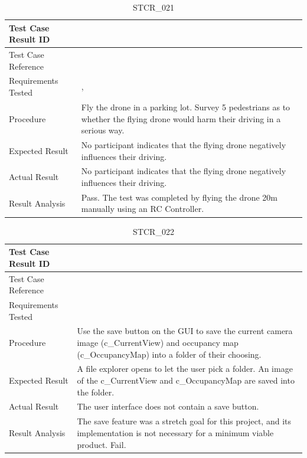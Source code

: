 \documentclass[12pt, titlepage]{article}
\begin{document}
\begin{table}[!h]
\begin{center}
\caption {STCR\_021}
\label{tab:STCR_021}
\begin{tabular}{ | m{3.2cm} | m{12.2cm} | } 
\hline
Test Case Result ID & \nameref{tab:STCR_021} \\ 
\hline
Test Case Reference & \nameref{tab:STC_021}  \\ 
\hline
Requirements Tested & \nameref{SAFE_004}, \nameref{SAFE_001}
 \\ 
\hline
Procedure & Fly the drone in a parking lot. Survey 5 pedestrians as to whether the flying drone would harm their driving in a serious way. \\
\hline
Expected Result & No participant indicates that the flying drone negatively influences their driving.  \\ 
\hline
Actual Result &  No participant indicates that the flying drone negatively influences their driving.  \\
\hline
Result Analysis & Pass. The test was completed by flying the drone 20m manually using an RC Controller. \\ 
\hline
\end{tabular}
\end{center}
\end{table}


\begin{table}[!h]
\begin{center}
\caption {STCR\_022}
\label{tab:STCR_022}
\begin{tabular}{ | m{3.2cm} | m{12.2cm} | } 
\hline
Test Case Result ID & \nameref{tab:STCR_022} \\ 
\hline
Test Case Reference & \nameref{tab:STC_022}  \\ 
\hline
Requirements Tested & \nameref{USE_002} \\
\hline
Procedure & Use the save button on the GUI to save the current camera image (c\_CurrentView) and occupancy map (c\_OccupancyMap) into a folder of their choosing. \\
\hline
Expected Result & A file explorer opens to let the user pick a folder. An image of the c\_CurrentView and c\_OccupancyMap are saved into the folder.  \\ 
\hline
Actual Result &  The user interface does not contain a save button.   \\
\hline
Result Analysis & The save feature was a stretch goal for this project, and its implementation is not necessary for a minimum viable product. Fail. \\ 
\hline
\end{tabular}
\end{center}
\end{table}
\end{document}
